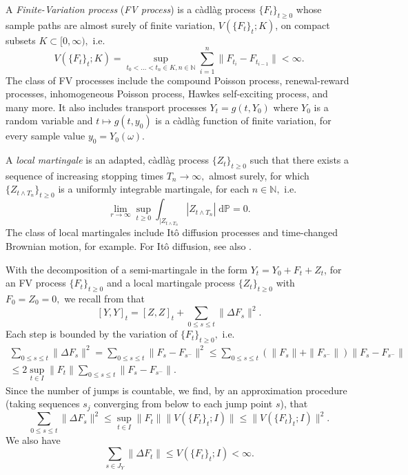 \documentclass[reqno,12pt]{amsart}
\theoremstyle{plain} %
\theoremstyle{definition} %
\begin{document}
A \emph{Finite-Variation process} (\emph{FV process}) is a c\`adl\`ag process $\{F_t\}_{t \geq 0}$ whose sample paths are almost surely of finite variation, $V(\{F_t\}_t; K)$, on compact subsets $K\subset [0, \infty),$ i.e.
\[ V(\{F_t\}_t; K) = \sup_{t_0 < \ldots < t_n \in K, n\in \mathbb{N}} \sum_{i=1}^n \|F_{t_i} - F_{t_{i-1}}\| < \infty.
\]
The class of FV processes include the compound Poisson process, renewal-reward processes, inhomogeneous Poisson process, Hawkes self-exciting process, and many more. It also includes transport processes $Y_t = g(t, Y_0)$ where $Y_0$ is a random variable and $t \mapsto g(t, y_0)$ is a c\`adl\`ag function of finite variation, for every sample value $y_0=Y_0(\omega)$.

A \emph{local martingale} is an adapted, c\`adl\`ag process $\{Z_t\}_{t\geq 0}$ such that there exists a sequence of increasing stopping times $T_n \rightarrow \infty,$ almost surely, for which $\{Z_{t \wedge T_n}\}_{t \geq 0}$ is a uniformly integrable martingale, for each $n\in\mathbb{N},$ i.e.
\[
    \lim_{r\rightarrow \infty} \sup_{t \geq 0} \int_{|Z_{t\wedge T_n}}|Z_{t\wedge T_n}|\;\mathrm{d}\mathbb{P} = 0.
\]
The class of local martingales include It\^o diffusion processes and time-changed Brownian motion, for example. For It\^o diffusion, see also \cite{Oksendal2003}.

With the decomposition of a semi-martingale in the form $Y_t = Y_0 + F_t + Z_t$, for an FV process $\{F_t\}_{t\geq 0}$ and a local martingale process $\{Z_t\}_{t\geq 0}$ with $F_0 = Z_0 = 0,$ we recall from \cite[Lemma 18.7]{Metivier1982} that
\[
    [Y, Y]_t = [Z, Z]_t + \sum_{0 \leq s \leq t} \|\Delta F_s\|^2.
\]
Each step is bounded by the variation of $\{F_t\}_{t\geq 0},$ i.e.
\begin{multline*}
    \sum_{0 \leq s \leq t} \|\Delta F_s\|^2 = \sum_{0 \leq s \leq t} \|F_s - F_{s^-}\|^2 \leq \sum_{0 \leq s \leq t} (\|F_s\| + \|F_{s^-}\|)\|F_s - F_{s^-}\| \\
    \leq 2\sup_{t\in I} \|F_t\| \sum_{0 \leq s \leq t} \|F_s - F_{s^-}\|.
\end{multline*}
Since the number of jumps is countable, we find, by an approximation procedure (taking sequences $s_j$ converging from below to each jump point $s$), that
\[
    \sum_{0 \leq s \leq t} \|\Delta F_s\|^2 \leq \sup_{t\in I} \|F_t\| \|V(\{F_t\}_t; I)\| \leq \|V(\{F_t\}_t; I)\|^2.
\]
We also have
\begin{equation}
    \label{estimatejumpfv}
    \sum_{s\in J_{Y}} \|\Delta F_t\| \leq V(\{F_t\}_t; I) < \infty.
\end{equation}
\end{document}
